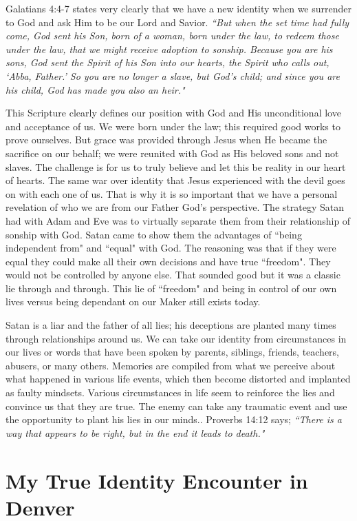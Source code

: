 \documentclass[oneside,12pt]{book}
\begin{document}
Galatians 4:4-7 states very clearly that we have a new identity when we surrender to God and ask Him to be our Lord and Savior. \textit{``But when the set time had fully come, God sent his Son, born of a woman, born under the law, to redeem those under the law, that we might receive adoption to sonship. Because you are his sons, God sent the Spirit of his Son into our hearts, the Spirit who calls out, `Abba, Father.' So you are no longer a slave, but God's child; and since you are his child, God has made you also an heir."}

This Scripture clearly defines our position with God and His unconditional love and acceptance of us. We were born under the law; this required good works to prove ourselves. But grace was provided through Jesus when He became the sacrifice on our behalf; we were reunited with God as His beloved sons and not slaves. The challenge is for us to truly believe and let this be reality in our heart of hearts. The same war over identity that Jesus experienced with the devil goes on with each one of us. That is why it is so important that we have a personal revelation of who we are from our Father God's perspective. The strategy Satan had with Adam and Eve was to virtually separate them from their relationship of sonship with God. Satan came to show them the advantages of ``being independent from" and ``equal" with God. The reasoning was that if they were equal they could make all their own decisions and have true ``freedom". They would not be controlled by anyone else. That sounded good but it was a classic lie through and through. This lie of ``freedom" and being in control of our own lives versus being dependant on our Maker still exists today. 

Satan is a liar and the father of all lies; his deceptions are planted many times through relationships around us. We can take our identity from circumstances in our lives or words that have been spoken by parents, siblings, friends, teachers, abusers, or many others. Memories are compiled from what we perceive about what happened in various life events, which then become distorted and implanted as faulty mindsets. Various circumstances in life seem to reinforce the lies and convince us that they are true. The enemy can take any traumatic event and use the opportunity to plant his lies in our minds.. Proverbs 14:12 says; \textit{``There is a way that appears to be right, but in the end it leads to death."}


\section{My True Identity Encounter in Denver}
\
\end{document}
